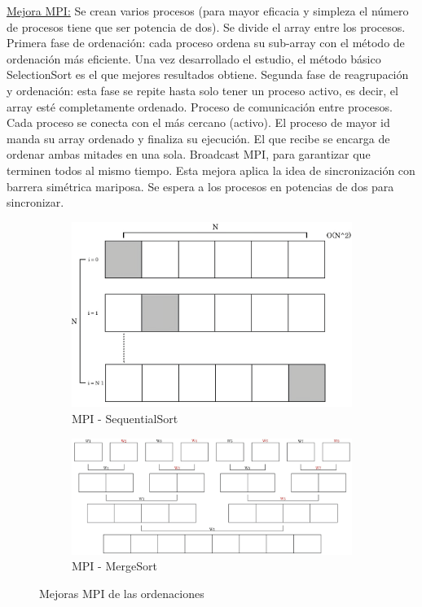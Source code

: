 \underline{Mejora MPI:}
Se crean varios procesos (para mayor eficacia y simpleza el número de procesos tiene que ser potencia de dos).  Se divide el array entre los procesos.
Primera fase de ordenación: cada proceso ordena su sub-array con el método de ordenación más eficiente. Una vez desarrollado el estudio, el método básico SelectionSort es el que mejores resultados obtiene.
Segunda fase de reagrupación y ordenación: esta fase se repite hasta solo tener un proceso activo, es decir, el array esté completamente ordenado.
Proceso de comunicación entre procesos. Cada proceso se conecta con el más cercano (activo). 
El proceso de mayor id manda su array ordenado y finaliza su ejecución. El que recibe se encarga de ordenar ambas mitades en una sola.
Broadcast MPI, para garantizar que terminen todos al mismo tiempo.
Esta mejora aplica la idea de sincronización con barrera simétrica mariposa. Se espera a los procesos en potencias de dos para sincronizar.


\begin{figure}[!h]
	\centering
	
	
	\begin{subfigure}[t]{0.33\textwidth}
		\centering
		\includegraphics[width=\textwidth]{images/chapter_3/sequentialsort_mpi}
		\caption{MPI - SequentialSort}
		\label{fig:sequentialsortmpi}
	\end{subfigure}
	\hfill
	\begin{subfigure}[t]{0.48\textwidth}
		\centering
		\includegraphics[width=\textwidth]{images/chapter_3/mergesort_mpi}
		\caption{MPI - MergeSort}
		\label{fig:mergesortmpi}
	\end{subfigure}
	
	\caption{Mejoras MPI de las ordenaciones}
	\label{fig:ordenacionesmpi}
\end{figure}


